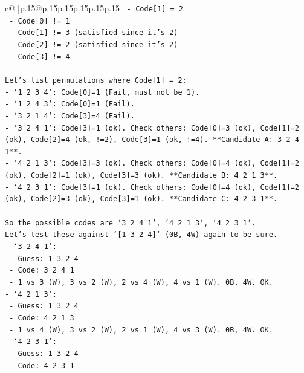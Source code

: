\documentclass{article}
\begin{document}
{\begin{supertabular}{c@{$\;$}|p{.15\linewidth}@{}p{.15\linewidth}p{.15\linewidth}p{.15\linewidth}p{.15\linewidth}p{.15\linewidth}}
{{{\texttt{  {-} Code{[}1{]} = 2} \\
\texttt{  {-} Code{[}0{]} != 1} \\
\texttt{  {-} Code{[}1{]} != 3 (satisfied since it's 2)} \\
\texttt{  {-} Code{[}2{]} != 2 (satisfied since it's 2)} \\
\texttt{  {-} Code{[}3{]} != 4} \\
\\ 
\texttt{Let's list permutations where Code{[}1{]} = 2:} \\
\texttt{{-} `1 2 3 4`: Code{[}0{]}=1 (Fail, must not be 1).} \\
\texttt{{-} `1 2 4 3`: Code{[}0{]}=1 (Fail).} \\
\texttt{{-} `3 2 1 4`: Code{[}3{]}=4 (Fail).} \\
\texttt{{-} `3 2 4 1`: Code{[}3{]}=1 (ok). Check others: Code{[}0{]}=3 (ok), Code{[}1{]}=2 (ok), Code{[}2{]}=4 (ok, !=2), Code{[}3{]}=1 (ok, !=4). **Candidate A: 3 2 4 1**.} \\
\texttt{{-} `4 2 1 3`: Code{[}3{]}=3 (ok). Check others: Code{[}0{]}=4 (ok), Code{[}1{]}=2 (ok), Code{[}2{]}=1 (ok), Code{[}3{]}=3 (ok). **Candidate B: 4 2 1 3**.} \\
\texttt{{-} `4 2 3 1`: Code{[}3{]}=1 (ok). Check others: Code{[}0{]}=4 (ok), Code{[}1{]}=2 (ok), Code{[}2{]}=3 (ok), Code{[}3{]}=1 (ok). **Candidate C: 4 2 3 1**.} \\
\\ 
\texttt{So the possible codes are `3 2 4 1`, `4 2 1 3`, `4 2 3 1`.} \\
\texttt{Let's test these against `{[}1 3 2 4{]}` (0B, 4W) again to be sure.} \\
\texttt{{-} `3 2 4 1`:} \\
\texttt{  {-} Guess: 1 3 2 4} \\
\texttt{  {-} Code: 3 2 4 1} \\
\texttt{  {-} 1 vs 3 (W), 3 vs 2 (W), 2 vs 4 (W), 4 vs 1 (W). 0B, 4W. OK.} \\
\texttt{{-} `4 2 1 3`:} \\
\texttt{  {-} Guess: 1 3 2 4} \\
\texttt{  {-} Code: 4 2 1 3} \\
\texttt{  {-} 1 vs 4 (W), 3 vs 2 (W), 2 vs 1 (W), 4 vs 3 (W). 0B, 4W. OK.} \\
\texttt{{-} `4 2 3 1`:} \\
\texttt{  {-} Guess: 1 3 2 4} \\
\texttt{  {-} Code: 4 2 3 1} \\
}}}
\end{supertabular}}
\end{document}
